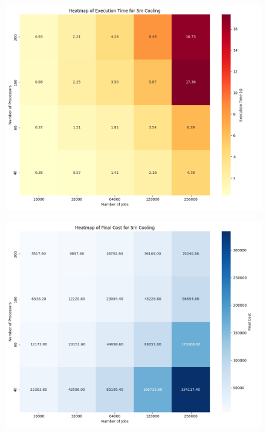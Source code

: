 \documentclass[openany, twoside, a4paper, 12pt]{extbook}
\begin{document}
\begin{figure}[ht]
    \centering
    \begin{minipage}{0.49\textwidth}
        \centering
        \includegraphics[width=\textwidth]{results_solo/SM_cooling_heatmap_execution_time.png}
        \label{fig:image5}
    \end{minipage}
    \hfill
    \begin{minipage}{0.49\textwidth}
        \centering
        \includegraphics[width=\textwidth]{results_solo/SM_cooling_heatmap_final_cost.png}
        \label{fig:image6}
    \end{minipage}
\end{figure}
\end{document}
